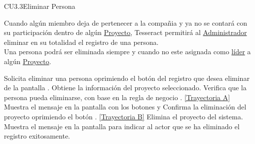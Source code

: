 	\begin{UseCase}{CU3.3}{Eliminar Persona}{

		Cuando algún miembro deja de pertenecer a la compañia y ya no se contará con su participación dentro de algún \hyperlink{proyectoEntidad}{Proyecto}, Tesseract permitirá al {\hyperlink{admin}{Administrador}} eliminar en su totalidad el registro de una persona. \\
	
		Una persona podrá ser eliminada siempre y cuando no este asignada como {\hyperlink{jefe}{líder}} a algún \hyperlink{proyectoEntidad}{Proyecto}.
	}
	\end{UseCase}
	\begin{UCtrayectoria}
		\UCpaso[\UCactor] Solicita eliminar una persona oprimiendo el botón \eliminar del registro que desea eliminar de la pantalla .
		\UCpaso[\UCsist] Obtiene la información del proyecto seleccionado.
		\UCpaso[\UCsist] Verifica que la persona pueda eliminarse, con base en la regla de negocio . \hyperlink{CU3-3:TAA}{[Trayectoria A]}
		\UCpaso[\UCsist] Muestra el mensaje  en la pantalla  con los botones  y 
		\UCpaso[\UCsist] Confirma la eliminación del proyecto oprimiendo el botón . \hyperlink{CU3-3:TAB}{[Trayectoria B]}
		\UCpaso[\UCsist] Elimina el proyecto del sistema.
		\UCpaso[\UCsist] Muestra el mensaje  en la pantalla  para indicar al actor que se ha eliminado el registro exitosamente.
	\end{UCtrayectoria}		
